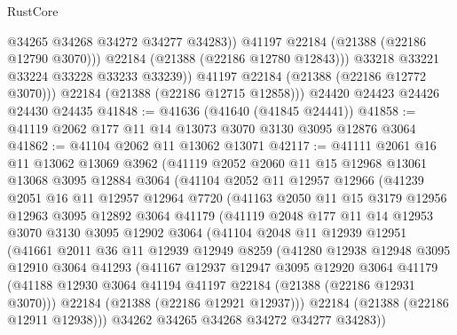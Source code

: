 \begin{lexlean}{RustCore}
\begin{coremodule}
                    @34265
                    @34268
                    @34272
                    @34277
                    @34283))
                @41197
                @22184
                (@21388 (@22186 @12790 @3070)))
              @22184
              (@21388 (@22186 @12780 @12843)))
            @33218
            @33221
            @33224
            @33228
            @33233
            @33239))
        @41197
        @22184
        (@21388 (@22186 @12772 @3070)))
      @22184
      (@21388 (@22186 @12715 @12858)))
    @24420
    @24423
    @24426
    @24430
    @24435
@41848 := @41636 (@41640 (@41845 @24441))
@41858 := @41119 @2062 @177 @11 @14 @13073 @3070 @3130 @3095 @12876 @3064
@41862 := @41104 @2062 @11 @13062 @13071
@42117 := @41111
    @2061
    @16
    @11
    @13062
    @13069
    @3962
    (@41119
      @2052
      @2060
      @11
      @15
      @12968
      @13061
      @13068
      @3095
      @12884
      @3064
      (@41104
        @2052
        @11
        @12957
        @12966
        (@41239
          @2051
          @16
          @11
          @12957
          @12964
          @7720
          (@41163
            @2050
            @11
            @15
            @3179
            @12956
            @12963
            @3095
            @12892
            @3064
            @41179
            (@41119
              @2048
              @177
              @11
              @14
              @12953
              @3070
              @3130
              @3095
              @12902
              @3064
              (@41104
                @2048
                @11
                @12939
                @12951
                (@41661
                  @2011
                  @36
                  @11
                  @12939
                  @12949
                  @8259
                  (@41280
                    @12938
                    @12948
                    @3095
                    @12910
                    @3064
                    @41293
                    (@41167
                      @12937
                      @12947
                      @3095
                      @12920
                      @3064
                      @41179
                      (@41188 @12930 @3064 @41194 @41197 @22184 (@21388 (@22186 @12931 @3070)))
                      @22184
                      (@21388 (@22186 @12921 @12937)))
                    @22184
                    (@21388 (@22186 @12911 @12938)))
                  @34262
                  @34265
                  @34268
                  @34272
                  @34277
                  @34283))

\end{coremodule}
\end{lexlean}
